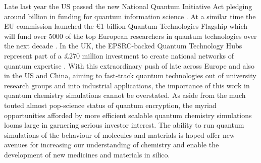 \documentclass[12pt]{article}
\begin{document}
Late last year the US passed the new National Quantum Initiative Act pledging around  billion in funding for quantum information science
 \cite{usbill}. At a similar time the EU commission launched the €1 billion Quantum Technologies Flagship which will fund over 5000 of the top
 European researchers in quantum technologies over the next decade \cite{eubill}. In the UK, the EPSRC-backed Quantum Technology Hubs represent
 part of a £270 million investment to create national networks of quantum expertise \cite{ukbill}. With this extraordinary push of late across
 Europe and also in the US and China, aiming to fast-track quantum technologies out of university research groups and into industrial applications,
  the importance of this work in quantum chemistry simulations cannot be overstated. As aside from the much touted almost pop-science status of
  quantum encryption, the myriad opportunities afforded by more efficient scalable quantum chemistry simulations looms large in garnering serious
   investor interest. The ability to run quantum simulations of the behaviour of molecules and materials is hoped offer new avenues for increasing
    our understanding of chemistry and enable the development of new medicines and materials in silico.





\end{document}
